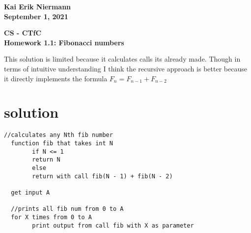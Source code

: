 \documentclass{article}%
\begin{document}
\begin{flushright}
\textbf{Kai Erik Niermann \\
September 1, 2021}
\end{flushright}

\begin{center}
\textbf{CS - CTfC \\
Homework 1.1: Fibonacci numbers} \\
\end{center}

This solution is limited because it calculates calls its already made. Though in terms of intuitive understanding I think the recursive approach
is better because it directly implements the formula \(F_{n} =F_{n-1} +F_{n-2}\)

\section*{solution}

\begin{lstlisting}[]
  //calculates any Nth fib number
  function fib that takes int N 
        if N <= 1 
        return N
        else 
        return with call fib(N - 1) + fib(N - 2) 

  get input A

  //prints all fib num from 0 to A
  for X times from 0 to A
        print output from call fib with X as parameter
\end{lstlisting}

  
\end{document}
